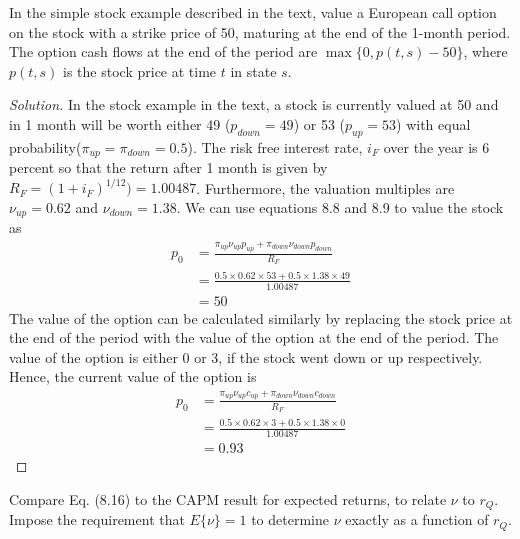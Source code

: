 \begin{problem}{8.1}
  In the simple stock example described in the text, value a European call option on the stock with a strike price of 50, maturing at the end of the 1-month period. The option cash flows at the end of the period are $\max\{0,p(t,s)-50\}$, where $p(t,s)$ is the stock price at time $t$ in state $s$.
\end{problem}

\begin{proof}[Solution]
  In the stock example in the text, a stock is currently valued at 50 and in 1 month will be worth either 49 ($p_{down}=49$) or 53 ($p_{up}=53$) with equal probability($\pi_{up}=\pi_{down}=0.5$). The risk free interest rate, $i_{F}$ over the year is 6 percent so that the return after 1 month is given by $R_{F}=(1+i_{F})^{1/12})=1.00487$. Furthermore, the valuation multiples are $\nu_{up}=0.62$ and $\nu_{down}=1.38$. We can use equations 8.8 and 8.9 to value the stock as
  \begin{align*}
   p_{0} &= \frac{\pi_{up}\nu_{up}p_{up} + \pi_{down}\nu_{down}p_{down}}{R_{F}} \\
	 &= \frac{0.5\times0.62\times53 + 0.5\times1.38\times49}{1.00487}\\
	 &= 50
  \end{align*}
  The value of the option can be calculated similarly by replacing the stock price at the end of the period with the value of the option at the end of the period. The value of the option is either 0 or 3, if the stock went down or up respectively. Hence, the current value of the option is
  \begin{align*}
   p_{0} &= \frac{\pi_{up}\nu_{up}c_{up} + \pi_{down}\nu_{down}c_{down}}{R_{F}}\\
	 &= \frac{0.5\times0.62\times3 + 0.5\times1.38\times0}{1.00487}\\
	 &= 0.93
  \end{align*}
\end{proof}

\begin{problem}{8.2}
 Compare Eq. (8.16) to the CAPM result for expected returns, to relate $\nu$ to $r_{Q}$. Impose the requirement that $E\{\nu\}=1$ to determine $\nu$ exactly as a function of $r_{Q}$.
\end{problem}

